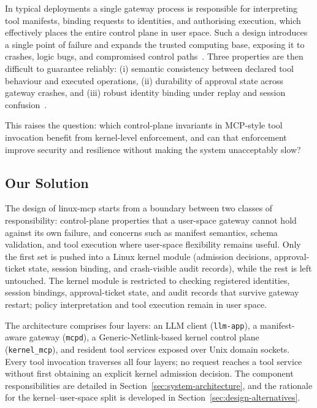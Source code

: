 In typical deployments a single gateway process is responsible for interpreting tool manifests, binding requests to identities, and authorising execution, which effectively places the entire control plane in user space.
Such a design introduces a single point of failure and expands the trusted computing base, exposing it to crashes, logic bugs, and compromised control paths~\cite{peter2014arrakis}.
Three properties are then difficult to guarantee reliably: (i) semantic consistency between declared tool behaviour and executed operations, (ii) durability of approval state across gateway crashes, and (iii) robust identity binding under replay and session confusion~\cite{qin2024toolllm,greshake2023prompt}.

This raises the question: which control-plane invariants in MCP-style tool invocation benefit from kernel-level enforcement, and can that enforcement improve security and resilience without making the system unacceptably slow?

\subsection{Our Solution}

The design of linux-mcp starts from a boundary between two classes of responsibility: control-plane properties that a user-space gateway cannot hold against its own failure, and concerns such as manifest semantics, schema validation, and tool execution where user-space flexibility remains useful.
Only the first set is pushed into a Linux kernel module (admission decisions, approval-ticket state, session binding, and crash-visible audit records), while the rest is left untouched.
The kernel module is restricted to checking registered identities, session bindings, approval-ticket state, and audit records that survive gateway restart; policy interpretation and tool execution remain in user space.

The architecture comprises four layers: an LLM client (\texttt{llm-app}), a manifest-aware gateway (\texttt{mcpd}), a Generic-Netlink-based kernel control plane (\texttt{kernel\_\allowbreak mcp}), and resident tool services exposed over Unix domain sockets.
Every tool invocation traverses all four layers; no request reaches a tool service without first obtaining an explicit kernel admission decision.
The component responsibilities are detailed in Section~\ref{sec:system-architecture}, and the rationale for the kernel--user-space split is developed in Section~\ref{sec:design-alternatives}.

